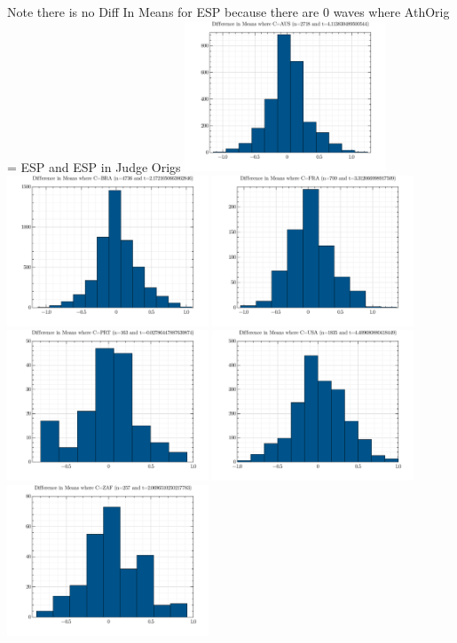 \documentclass{article}
\theoremstyle{definition}
\begin{document}
Note there is no Diff In Means for ESP because there are 0 waves where AthOrig = ESP and ESP in Judge Origs
\includegraphics[width=6cm]{./src/visuals/DistOfDiffInMeansForAUS.png}
\includegraphics[width=6cm]{./src/visuals/DistOfDiffInMeansForBRA.png}
\includegraphics[width=6cm]{./src/visuals/DistOfDiffInMeansForFRA.png}
\includegraphics[width=6cm]{./src/visuals/DistOfDiffInMeansForPRT.png}
\includegraphics[width=6cm]{./src/visuals/DistOfDiffInMeansForUSA.png}
\includegraphics[width=6cm]{./src/visuals/DistOfDiffInMeansForZAF.png}
\end{document}
